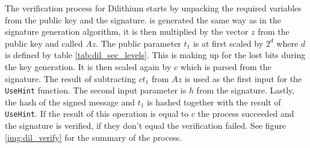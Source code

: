The verification process for Dilithium starts by unpacking the required variables from the public key and the signature.  is generated the same way as in the signature generation algorithm, it is then multiplied by the vector $z$ from the public key and called $Az$. The public parameter $t_1$ is at first scaled by $2^d$ where $d$ is defined by table \ref{tab:dil_sec_levels}. This is making up for the lost bits during the key generation. It is then scaled again by $c$ which is parsed from the signature. The result of subtracting $ct_1$ from $Az$ is used as the first input for the \texttt{UseHint} function. The second input parameter is $h$ from the signature. Lastly, the hash of the signed message and $t_1$ is hashed together with the result of \texttt{UseHint}. If the result of this operation is equal to $c$ the process succeeded and the signature is verified, if they don't equal the verification failed. See figure \ref{img:dil_verify} for the summary of the process.
\clearpage
{}
